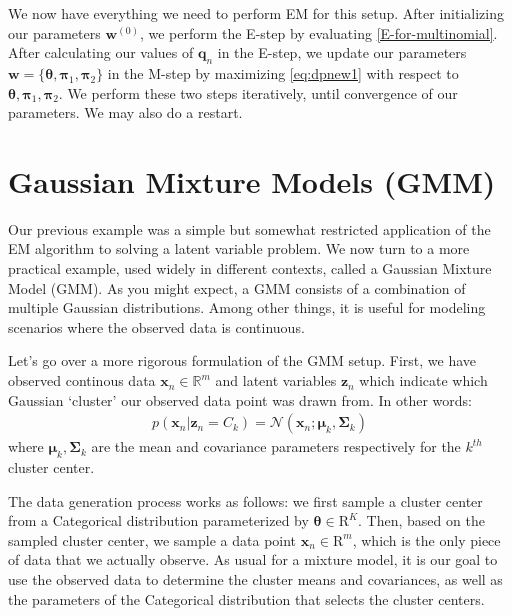 We now have everything we need to perform EM for this setup. After initializing our parameters $\textbf{w}^{(0)}$, we perform the E-step by evaluating \ref{E-for-multinomial}. After calculating our values of $\textbf{q}_n$ in the E-step, we update our parameters $\textbf{w} = \{\boldsymbol{\theta}, \boldsymbol{\pi}_1, \boldsymbol{\pi}_2 \}$ in the M-step by maximizing \ref{eq:dpnew1} with respect to $\boldsymbol{\theta}, \boldsymbol{\pi}_1, \boldsymbol{\pi}_2$. We perform these two steps iteratively, until convergence of our parameters. We may also do a restart.

\section{Gaussian Mixture Models (GMM)}
Our previous example was a simple but somewhat restricted application of the EM algorithm to solving a latent variable problem. We now turn to a more practical example, used widely in different contexts, called a Gaussian Mixture Model (GMM). As you might expect, a GMM consists of a combination of multiple Gaussian distributions. Among other things, it is useful for modeling scenarios where the observed data is continuous.

Let's go over a more rigorous formulation of the GMM setup. First, we have observed continous data $\textbf{x}_n \in \mathbb{R}^{m}$ and latent variables $\textbf{z}_n$ which indicate which Gaussian `cluster' our observed data point was drawn from. In other words:
\begin{align*}
    p(\textbf{x}_n | \textbf{z}_n = C_k) = \mathcal{N}(\textbf{x}_n; \boldsymbol{\mu}_k, \boldsymbol{\Sigma}_k)
\end{align*}
where $\boldsymbol{\mu}_k, \boldsymbol{\Sigma}_k$ are the mean and covariance parameters respectively for the $k^{th}$ cluster center.

The data generation process works as follows: we first sample a cluster center from a Categorical distribution parameterized by $\boldsymbol{\theta} \in \mathrm{R}^{K}$. Then, based on the sampled cluster center, we sample a data point $\textbf{x}_n \in \mathrm{R}^{m}$, which is the only piece of data that we actually observe. As usual for a mixture model, it is our goal to use the observed data to determine the cluster means and covariances, as well as the parameters of the Categorical distribution that selects the cluster centers.

